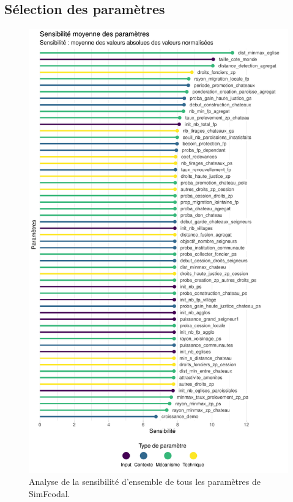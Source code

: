 \subsection{Sélection des paramètres}

\begin{figure}[H]
	\centering
	\includegraphics[width=\linewidth]{img/sensibilite_globale.pdf}
	\caption{Analyse de la sensibilité d'ensemble de tous les paramètres de SimFeodal.}
	\label{fig:sensibilite-globale}
\end{figure}

